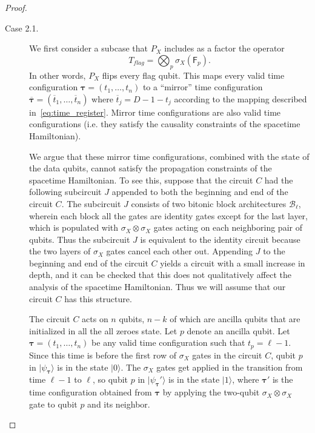 \documentclass[11pt,letterpaper]{article}
\theoremstyle{definition}
\theoremstyle{remark}
\newcommand{\cB}{\mathcal B}
\numberwithin{equation}{section}
\theoremstyle{definition}
\newcommand{\comp}[1]{\overline{#1}}
\newcommand{\ket}[1]{|#1\rangle}
\newcommand{\sF}{{\mathsf{F}}}
\newcommand{\timeconfig}{{\bm{\tau}}}
\begin{document}
\begin{proof}
\begin{description}
  \begin{description}
    
  \item[Case 2.1.] We first consider a subcase that $P_X$ includes as a factor the operator
  \begin{equation}
    T_{flag} = \bigotimes_p \sigma_X(\sF_p).
  \end{equation}
  In other words, $P_X$ flips every flag qubit. This maps every valid time configuration $\timeconfig = (t_1,\ldots,t_n)$ to a ``mirror'' time configuration $\comp{\timeconfig} = (\comp{t}_1,\ldots,\comp{t}_n)$ where $\comp{t}_j = D-1 - t_j$ according to the mapping described in~\eqref{eq:time_register}. Mirror time configurations are also valid time configurations (i.e. they satisfy the causality constraints of the spacetime Hamiltonian). %
  
  We argue that these mirror time configurations, combined with the state of the data qubits, cannot satisfy the propagation constraints of the spacetime Hamiltonian. To see this, suppose that the circuit $C$ had the following subcircuit $J$ appended to both the beginning and end of the circuit $C$. The subcircuit $J$ consists of two bitonic block architectures $\cB_\ell$, wherein each block all the gates are identity gates except for the last layer, which is populated with $\sigma_X \otimes \sigma_X$ gates acting on each neighboring pair of qubits. Thus the subcircuit $J$ is equivalent to the identity circuit because the two layers of $\sigma_X$ gates cancel each other out. Appending $J$ to the beginning and end of the circuit $C$ yields a circuit with a small increase in depth, and it can be checked that this does not qualitatively affect the analysis of the spacetime Hamiltonian. Thus we will assume that our circuit $C$ has this structure.
  
  The circuit $C$ acts on $n$ qubits, $n - k$ of which are ancilla qubits that are initialized in all the all zeroes state. Let $p$ denote an ancilla qubit. Let $\timeconfig = (t_1,\ldots,t_n)$ be any valid time configuration such that $t_p = \ell-1$. Since this time is before the first row of $\sigma_X$ gates in the circuit $C$, qubit $p$ in $\ket{\psi_\timeconfig}$ is in the state $\ket{0}$. The $\sigma_X$ gates get applied in the transition from time $\ell - 1$ to $\ell$, so qubit $p$ in $\ket{\psi_\timeconfig'}$ is in the state $\ket{1}$, where $\timeconfig'$ is the time configuration obtained from $\timeconfig$ by applying the two-qubit $\sigma_X \otimes \sigma_X$ gate to qubit $p$ and its neighbor. 
  

\end{description}
\end{description}
\end{proof}
\end{document}
